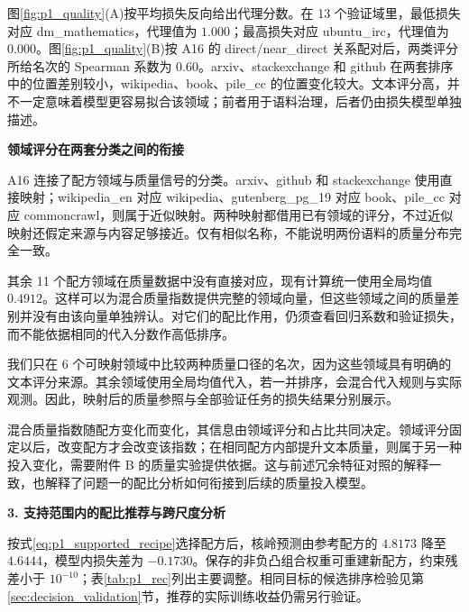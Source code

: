 图\ref{fig:p1_quality}(A)按平均损失反向给出代理分数。在 13 个验证域里，最低损失对应 dm\_\allowbreak{}mathematics，代理值为 $1.000$；最高损失对应 ubuntu\_\allowbreak{}irc，代理值为 $0.000$。图\ref{fig:p1_quality}(B)按 A16 的 direct/near\_\allowbreak{}direct 关系配对后，两类评分所给名次的 Spearman 系数为 $0.60$。arxiv、stackexchange 和 github 在两套排序中的位置差别较小，wikipedia、book、pile\_\allowbreak{}cc 的位置变化较大。文本评分高，并不一定意味着模型更容易拟合该领域；前者用于语料治理，后者仍由损失模型单独描述。

\textbf{领域评分在两套分类之间的衔接}\par\nopagebreak[4]

A16 连接了配方领域与质量信号的分类。arxiv、github 和 stackexchange 使用直接映射；wikipedia\_\allowbreak{}en 对应 wikipedia、gutenberg\_\allowbreak{}pg\_\allowbreak{}19 对应 book、pile\_\allowbreak{}cc 对应 commoncrawl，则属于近似映射。两种映射都借用已有领域的评分，不过近似映射还假定来源与内容足够接近。仅有相似名称，不能说明两份语料的质量分布完全一致。

其余 11 个配方领域在质量数据中没有直接对应，现有计算统一使用全局均值 $0.4912$。这样可以为混合质量指数提供完整的领域向量，但这些领域之间的质量差别并没有由该向量单独辨认。对它们的配比作用，仍须查看回归系数和验证损失，而不能依据相同的代入分数作高低排序。

我们只在 6 个可映射领域中比较两种质量口径的名次，因为这些领域具有明确的文本评分来源。其余领域使用全局均值代入，若一并排序，会混合代入规则与实际观测。因此，映射后的质量参照与全部验证任务的损失结果分别展示。

混合质量指数随配方变化而变化，其信息由领域评分和占比共同决定。领域评分固定以后，改变配方才会改变该指数；在相同配方内部提升文本质量，则属于另一种投入变化，需要附件 B 的质量实验提供依据。这与前述冗余特征对照的解释一致，也解释了问题一的配比分析如何衔接到后续的质量投入模型。

\FloatBarrier
{}
\textbf{3. 支持范围内的配比推荐与跨尺度分析}\par\nopagebreak[4]

按式\eqref{eq:p1_supported_recipe}选择配方后，核岭预测由参考配方的 $4.8173$ 降至 $4.6444$，模型内损失差为 $-0.1730$。保存的非负凸组合权重可重建新配方，约束残差小于 $10^{-10}$；表\ref{tab:p1_rec}列出主要调整。相同目标的候选排序检验见第\ref{sec:decision_validation}节，推荐的实际训练收益仍需另行验证。

